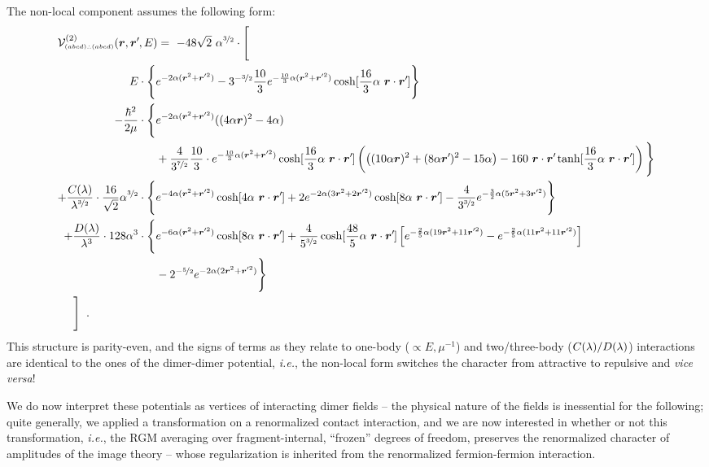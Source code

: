 \documentclass[onecolumn,preprint,superscriptaddress,nofootinbib,notitlepage,10pt,linenumbers]{revtex4-1}
\newcommand*{\mprime}{^{\prime}\mkern-1.2mu}
\newcommand{\ie}{\textit{i.e.}\;}
\newcommand{\ve}[1]{\ensuremath{\boldsymbol{#1}}}
\newcommand{\cc}{\ensuremath C(\lambda)}
\newcommand{\dd}{\ensuremath D(\lambda)}
\newcommand{\alal}{\ensuremath $(abcd)\wasytherefore(abcd)$}
\begin{document}
\begin{description}
The non-local component assumes the following form:
\begin{align}
\multispan2{$\displaystyle \mathcal{V}^{(2)}_{\text{\tiny\alal}}(\ve{r},\ve{r}\mprime,E)=
~-48\sqrt{2}~\alpha^{\nicefrac{3}{2}}\cdot
\Bigg[$\hfil}\nonumber\\
E\cdot\Bigg\lbrace & e^{-2\alpha(\ve{r}^2+\ve{r}\mprime^2)}-3^{-\nicefrac{3}{2}}\frac{10}{3}e^{-\frac{10}{3}\alpha(\ve{r}^2+\ve{r}\mprime^2)}
\cosh[\frac{16}{3}\alpha~\ve{r}\cdot\ve{r}\mprime]\Bigg\rbrace\\
-\frac{\hbar^2}{2\mu}\cdot\Bigg\lbrace & e^{-2\alpha(\ve{r}^2+\ve{r}\mprime^2)}((4\alpha\ve{r})^2-4\alpha)\\
&+\frac{4}{3^{\nicefrac{7}{2}}}\frac{10}{3}\cdot e^{-\frac{10}{3}\alpha(\ve{r}^2+\ve{r}\mprime^2)}\cosh[\frac{16}{3}\alpha~\ve{r}\cdot\ve{r}\mprime]
\left(\left((10\alpha\ve{r})^2+(8\alpha \ve{r}\mprime)^2-15\alpha\right)-160~\ve{r}\cdot\ve{r}\mprime\tanh[\frac{16}{3}\alpha~\ve{r}\cdot\ve{r}\mprime]\right)
\Bigg\rbrace\nonumber\\
+\frac{\cc}{\lambda^{\nicefrac{3}{2}}}\cdot\frac{16}{\sqrt{2}}\alpha^{\nicefrac{3}{2}}\cdot \Bigg\lbrace &
 e^{-4\alpha(\ve{r}^2+\ve{r}\mprime^2)}\cosh[4\alpha~\ve{r}\cdot\ve{r}\mprime]
 +2e^{-2\alpha(3\ve{r}^2+2\ve{r}\mprime^2)}\cosh[8\alpha~\ve{r}\cdot\ve{r}\mprime]
 -\frac{4}{3^{\nicefrac{3}{2}}}e^{-\frac{3}{2}\alpha(5\ve{r}^2+3\ve{r}\mprime^2)}
 \Bigg\rbrace\\
 +\frac{\dd}{\lambda^3}\cdot 128\alpha^3\cdot
 \Bigg\lbrace &
  e^{-6\alpha(\ve{r}^2+\ve{r}\mprime^2)}\cosh[8\alpha~\ve{r}\cdot\ve{r}\mprime]
 +\frac{4}{5^{\nicefrac{3}{2}}}\cosh[\frac{48}{5}\alpha~\ve{r}\cdot\ve{r}\mprime]\left[
e^{-\frac{2}{5}\alpha(19\ve{r}^2+11\ve{r}\mprime^2)}-e^{-\frac{2}{5}\alpha(11\ve{r}^2+11\ve{r}\mprime^2)}
 \right]\nonumber\\
 &-2^{-\nicefrac{5}{2}}e^{-2\alpha(2\ve{r}^2+\ve{r}\mprime^2)}\Bigg\rbrace\\
 \multispan2{$\displaystyle \;\;\;\;\;\Bigg]\;\;.$\hfil}
\end{align}
This structure is parity-even, and the signs of terms as they relate to one-body ($\propto E,\mu^{-1}$) and two/three-body ($\cc/\dd$)
interactions are identical to the ones of the dimer-dimer potential, \ie, the non-local form switches the character from
attractive to repulsive and {\it vice versa}!

\end{description}

We do now interpret these potentials as vertices of interacting dimer fields -- the physical nature of the fields is
inessential for the following; quite generally, we applied a transformation on a renormalized contact interaction, and
we are now interested in whether or not this transformation, \ie, the RGM averaging over fragment-internal, ``frozen''
degrees of freedom, preserves the renormalized character of amplitudes of the image theory -- whose regularization is
inherited from the renormalized fermion-fermion interaction.
\end{document}
